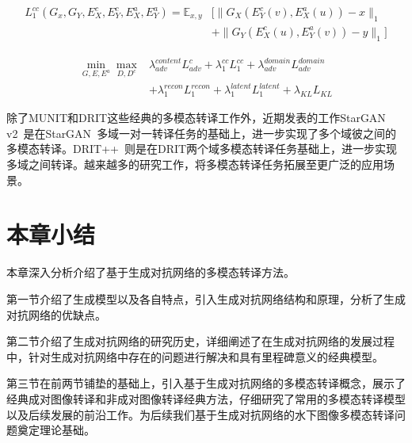 \begin{equation}
\label{equ:drit_cc}
\begin{aligned}
L_1^{cc}(G_x,G_Y,E_X^c,E_Y^c,E_X^a,E_Y^a) = \mathbb{E}_{x,y}&[\parallel G_X(E_Y^c(v),E_X^a(u))-x \parallel_1 \\
& + \parallel G_Y(E_X^c(u),E_Y^a(v))-y \parallel_1]
\end{aligned}
\end{equation}

\begin{equation}
\label{equ:drit}
\begin{aligned}
\min \limits_{G,E,E^a} \max \limits_{D,D^c} & \lambda_{adv}^{content}L_{adv}^c + \lambda_1^{cc}L_1^{cc} + \lambda_{adv}^{domain}L_{adv}^{domain} \\
& + \lambda_1^{recon}L_1^{recon} + \lambda_1^{latent}L_1^{latent} + \lambda_{KL}L_{KL}
\end{aligned}
\end{equation}

除了MUNIT和DRIT这些经典的多模态转译工作外，近期发表的工作StarGAN v2~\cite{choi2020stargan}是在StarGAN~\cite{choi2018stargan}多域一对一转译任务的基础上，进一步实现了多个域彼之间的多模态转译。DRIT++~\cite{lee2020drit++}则是在DRIT两个域多模态转译任务基础上，进一步实现多域之间转译。越来越多的研究工作，将多模态转译任务拓展至更广泛的应用场景。


\section{本章小结}
本章深入分析介绍了基于生成对抗网络的多模态转译方法。

第一节介绍了生成模型以及各自特点，引入生成对抗网络结构和原理，分析了生成对抗网络的优缺点。

第二节介绍了生成对抗网络的研究历史，详细阐述了在生成对抗网络的发展过程中，针对生成对抗网络中存在的问题进行解决和具有里程碑意义的经典模型。

第三节在前两节铺垫的基础上，引入基于生成对抗网络的多模态转译概念，展示了经典成对图像转译和非成对图像转译经典方法，仔细研究了常用的多模态转译模型以及后续发展的前沿工作。为后续我们基于生成对抗网络的水下图像多模态转译问题奠定理论基础。